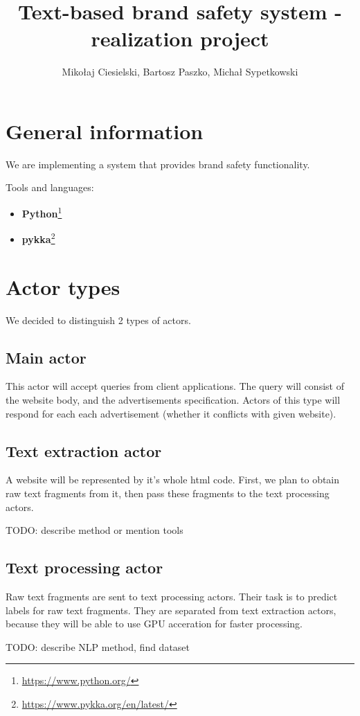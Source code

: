 \documentclass[a4paper]{article}
\begin{document}
\title{Text-based brand safety system - realization project}

\author{Mikołaj Ciesielski, Bartosz Paszko, Michał Sypetkowski}
\maketitle

\section{General information}

We are implementing a system
that provides brand safety functionality.

Tools and languages:
\begin{itemize}
    \item \textbf{Python}\footnote{\url{https://www.python.org/}}
    \item \textbf{pykka}\footnote{\url{https://www.pykka.org/en/latest/}}
\end{itemize}



\section{Actor types}
We decided to distinguish 2 types of actors.

\subsection{Main actor}
This actor will accept queries from client applications.
The query will consist of the website body, and the advertisements specification.
Actors of this type will respond for each each advertisement
(whether it conflicts with given website).

\subsection{Text extraction actor}
A website will be represented by it's whole html code.
First, we plan to obtain raw text fragments from it,
then pass these fragments to the text processing actors.

TODO: describe method or mention tools

\subsection{Text processing actor}
Raw text fragments are sent to text processing actors.
Their task is to predict labels for raw text fragments.
They are separated from text extraction actors,
because they will be able to use GPU acceration
for faster processing.

TODO: describe NLP method, find dataset
\end{document}
